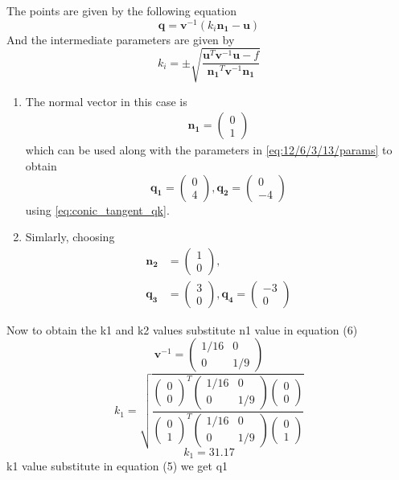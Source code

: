 \documentclass[10pt, a4paper]{article}
\newcommand{\myvec}[1]{\ensuremath{\begin{pmatrix}#1\end{pmatrix}}}
\let\vec\mathbf
\begin{document}
The points are given by the following equation\\
\begin{equation}
\vec{q}=\vec{v}^{-1}(k_i\vec{n_1}-\vec{u})
\end{equation}
And the intermediate parameters are given by\\
\begin{equation}
k_i=\pm\sqrt{\frac{\vec{u}^T\vec{v}^{-1}\vec{u}-f}{\vec{n_1}^T\vec{v}^{-1}\vec{n_1}}}
\end{equation}
\fi
\begin{enumerate}
	\item The 
normal vector  in this case is
\begin{align}
		\vec{n_1}=\myvec{0\\1}
\end{align}
which can be used along with the parameters in 
		\eqref{eq:12/6/3/13/params}
		to obtain 
\begin{equation}
\vec{q_1}=\myvec{0\\4},
\vec{q_2}=\myvec{0\\-4}
\end{equation}
using 
\eqref{eq:conic_tangent_qk}.
\item Simlarly, 
	choosing
\begin{align}
	\vec{n_2}&=\myvec{1\\0},
	\\
	\vec{q_3}&=\myvec{3\\0},
	\vec{q_4}=\myvec{-3\\0}
\end{align}
\end{enumerate}
\iffalse
Now to obtain the k1 and k2 values substitute n1 value in equation (6)\\
\begin{equation}
\vec{v}^{-1}=\myvec{1/16&0\\0&1/9}
\end{equation}
\begin{equation}
k_1=\sqrt{\frac{\myvec{0\\0}^T\myvec{1/16&0\\0&1/9}\myvec{0\\0}}{\myvec{0\\1}^T\myvec{1/16&0\\0&1/9}\myvec{0\\1}}}
\end{equation}
\begin{equation}
k_1=31.17
\end{equation}
k1 value substitute in equation (5) we get q1\\
\end{document}
